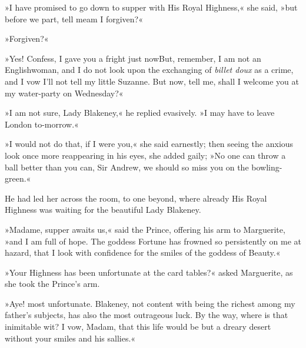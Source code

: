 »I have promised to go down to supper with His Royal Highness,« she said, »but before we part, tell me\textellipsis \allowbreak  am I forgiven?«

»Forgiven?«

»Yes! Confess, I gave you a fright just now\textellipsis \allowbreak  But, remember, I am not an Englishwoman, and I do not look upon the exchanging of \textit{billet doux} as a crime, and I vow I'll not tell my little Suzanne. But now, tell me, shall I welcome you at my water-party on Wednesday?«

»I am not sure, Lady Blakeney,« he replied evasively. »I may have to leave London to-morrow.«

»I would not do that, if I were you,« she said earnestly; then seeing the anxious look once more reappearing in his eyes, she added gaily; »No one can throw a ball better than you can, Sir Andrew, we should so miss you on the bowling-green.«

He had led her across the room, to one beyond, where already His Royal Highness was waiting for the beautiful Lady Blakeney.

»Madame, supper awaits us,« said the Prince, offering his arm to Marguerite, »and I am full of hope. The goddess Fortune has frowned so persistently on me at hazard, that I look with confidence for the smiles of the goddess of Beauty.«

»Your Highness has been unfortunate at the card tables?« asked Marguerite, as she took the Prince's arm.

»Aye! most unfortunate. Blakeney, not content with being the richest among my father's subjects, has also the most outrageous luck. By the way, where is that inimitable wit? I vow, Madam, that this life would be but a dreary desert without your smiles and his sallies.«

